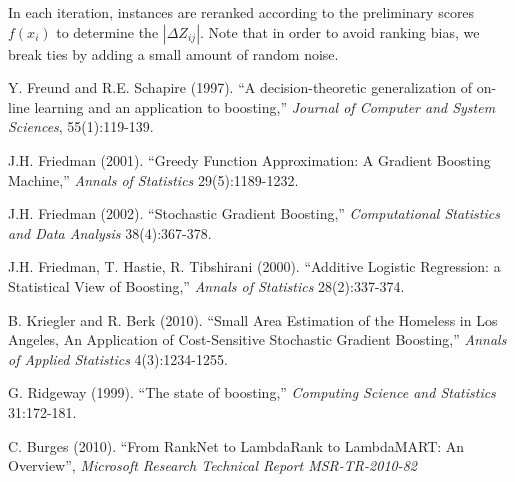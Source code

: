 \documentclass{article}
\begin{document}
In each iteration, instances are reranked according to the preliminary
scores $f(x_i)$ to determine the $|\Delta Z_{ij}|$. Note that in order
to avoid ranking bias, we break ties by adding a small amount of
random noise.

\begin{thebibliography}{77}     %

\small                          %

 Y. Freund and R.E. Schapire (1997). ``A decision-theoretic generalization of on-line learning and an application to boosting,'' \textit{Journal of Computer and System Sciences}, 55(1):119-139.

 J.H. Friedman (2001). ``Greedy Function Approximation: A Gradient Boosting Machine,'' \textit{Annals of Statistics} 29(5):1189-1232.

 J.H. Friedman (2002). ``Stochastic Gradient Boosting,'' \textit{Computational Statistics and Data Analysis} 38(4):367-378.

 J.H. Friedman, T. Hastie, R. Tibshirani (2000). ``Additive Logistic Regression: a Statistical View of Boosting,'' \textit{Annals of Statistics} 28(2):337-374.
    
 B. Kriegler and R. Berk (2010). ``Small Area Estimation of the Homeless in Los Angeles, An Application of Cost-Sensitive Stochastic Gradient Boosting,'' \textit{Annals of Applied Statistics} 4(3):1234-1255.

 G. Ridgeway (1999). ``The state of boosting,'' \textit{Computing Science and Statistics} 31:172-181.

 C. Burges (2010). ``From RankNet to LambdaRank to LambdaMART: An Overview'', \textit{Microsoft Research Technical Report MSR-TR-2010-82}

\end{thebibliography}           %
\end{document}
